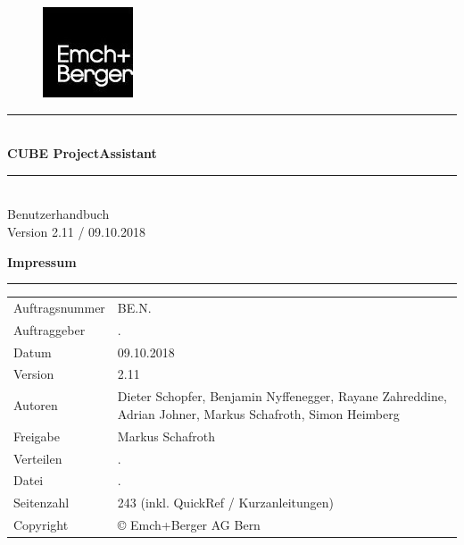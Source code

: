 \documentclass[12pt]{article} %
\newcommand{\HRule}{\rule{\linewidth}{0.5mm}} %
\begin{document}

\begin{titlepage}


\begin{figure}[t] %
\flushright  %
\includegraphics[width=0.2\linewidth]{0_EmBeLogo}
\end{figure}

\vspace*{6cm}

\center %

\HRule \\[0.4cm]
{ \huge \bfseries CUBE ProjectAssistant}\\[0.4cm] %
\HRule \\[1.5cm]

\textsf{\Large Benutzerhandbuch}\\[0.5cm] %
\textsf{\large Version 2.11 / 09.10.2018}\\[0.5cm] %


\pagebreak
\vspace*{15cm}

\flushleft\textbf{ Impressum}
\rule{\textwidth}{1pt}
\begin{flushright}
\begin{flushleft}

\end{flushleft}
\end{flushright}
\begin{tabular}{lp{12cm}}
Auftragsnummer & BE.N.\\
Auftraggeber & .\\
Datum & 09.10.2018\\
Version & 2.11\\
Autoren & Dieter Schopfer, Benjamin Nyffenegger, Rayane Zahreddine, Adrian Johner, Markus Schafroth, Simon Heimberg\\
Freigabe & Markus Schafroth\\
Verteilen & .\\
Datei & .\\
Seitenzahl & 243 (inkl. QuickRef / Kurzanleitungen)\\
Copyright & \copyright{ Emch+Berger AG Bern}\\
\end{tabular}


\end{titlepage}
\end{document}
